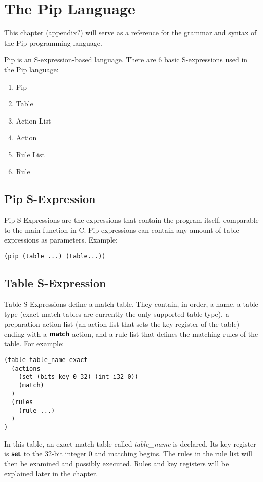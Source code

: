 \section{The Pip Language}
This chapter (appendix?) will serve as a reference for the grammar and syntax of the Pip programming language.

Pip is an S-expression-based language. There are 6 basic S-expressions used in the Pip language:
\begin{enumerate}
  \item Pip
  \item Table
  \item Action List
  \item Action
  \item Rule List
  \item Rule
\end{enumerate}

\subsection{Pip S-Expression}
Pip S-Expressions are the expressions that contain the program itself, comparable to the main function in C. Pip expressions can contain any amount of table expressions as parameters. Example:
\begin{verbatim}
(pip (table ...) (table...))
\end{verbatim}

\subsection{Table S-Expression}
Table S-Expressions define a match table. They contain, in order, a name, a table type (exact match tables are currently the only supported table type), a preparation action list (an action list that sets the key register of the table) ending with a $\bm{\mathsf{{match}}}$ action, and a rule list that defines the matching rules of the table. For example:
\begin{verbatim}
(table table_name exact
  (actions
    (set (bits key 0 32) (int i32 0))
    (match)
  )
  (rules
    (rule ...)
  )
)
\end{verbatim}
In this table, an exact-match table called \textit{table\_name} is declared. Its key register is $\bm{\mathsf{{set}}}$ to the 32-bit integer 0 and matching begins. The rules in the rule list will then be examined and possibly executed. Rules and key registers will be explained later in the chapter.

